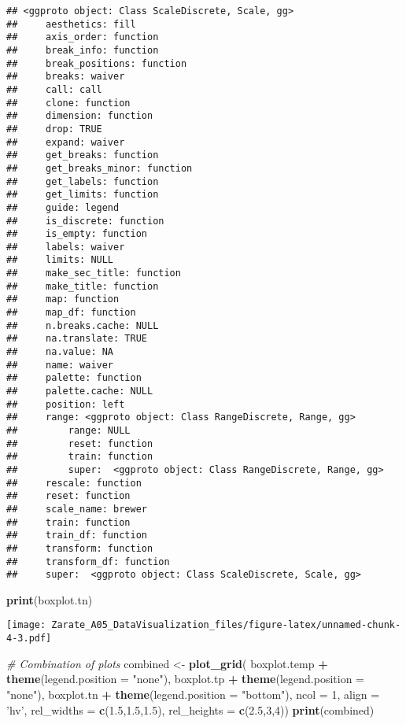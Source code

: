 \documentclass[
]{article}
\newenvironment{Shaded}{\begin{snugshade}}{\end{snugshade}}
\newcommand{\CommentTok}[1]{\textcolor[rgb]{0.56,0.35,0.01}{\textit{#1}}}
\newcommand{\DataTypeTok}[1]{\textcolor[rgb]{0.13,0.29,0.53}{#1}}
\newcommand{\DecValTok}[1]{\textcolor[rgb]{0.00,0.00,0.81}{#1}}
\newcommand{\FloatTok}[1]{\textcolor[rgb]{0.00,0.00,0.81}{#1}}
\newcommand{\KeywordTok}[1]{\textcolor[rgb]{0.13,0.29,0.53}{\textbf{#1}}}
\newcommand{\NormalTok}[1]{#1}
\newcommand{\OperatorTok}[1]{\textcolor[rgb]{0.81,0.36,0.00}{\textbf{#1}}}
\newcommand{\StringTok}[1]{\textcolor[rgb]{0.31,0.60,0.02}{#1}}
\begin{document}
\begin{verbatim}
## <ggproto object: Class ScaleDiscrete, Scale, gg>
##     aesthetics: fill
##     axis_order: function
##     break_info: function
##     break_positions: function
##     breaks: waiver
##     call: call
##     clone: function
##     dimension: function
##     drop: TRUE
##     expand: waiver
##     get_breaks: function
##     get_breaks_minor: function
##     get_labels: function
##     get_limits: function
##     guide: legend
##     is_discrete: function
##     is_empty: function
##     labels: waiver
##     limits: NULL
##     make_sec_title: function
##     make_title: function
##     map: function
##     map_df: function
##     n.breaks.cache: NULL
##     na.translate: TRUE
##     na.value: NA
##     name: waiver
##     palette: function
##     palette.cache: NULL
##     position: left
##     range: <ggproto object: Class RangeDiscrete, Range, gg>
##         range: NULL
##         reset: function
##         train: function
##         super:  <ggproto object: Class RangeDiscrete, Range, gg>
##     rescale: function
##     reset: function
##     scale_name: brewer
##     train: function
##     train_df: function
##     transform: function
##     transform_df: function
##     super:  <ggproto object: Class ScaleDiscrete, Scale, gg>
\end{verbatim}

\begin{Shaded}
\begin{Highlighting}[]
\KeywordTok{print}\NormalTok{(boxplot.tn)}
\end{Highlighting}
\end{Shaded}

\texttt{[image: Zarate\_A05\_DataVisualization\_files/figure-latex/unnamed-chunk-4-3.pdf]}

\begin{Shaded}
\begin{Highlighting}[]
\CommentTok{# Combination of plots}
\NormalTok{combined <-}\StringTok{ }\KeywordTok{plot_grid}\NormalTok{(}
\NormalTok{  boxplot.temp }\OperatorTok{+}\StringTok{ }\KeywordTok{theme}\NormalTok{(}\DataTypeTok{legend.position =} \StringTok{"none"}\NormalTok{),}
\NormalTok{  boxplot.tp }\OperatorTok{+}\StringTok{ }\KeywordTok{theme}\NormalTok{(}\DataTypeTok{legend.position =} \StringTok{"none"}\NormalTok{),}
\NormalTok{  boxplot.tn }\OperatorTok{+}\StringTok{ }\KeywordTok{theme}\NormalTok{(}\DataTypeTok{legend.position =} \StringTok{"bottom"}\NormalTok{),}
  \DataTypeTok{ncol =} \DecValTok{1}\NormalTok{, }\DataTypeTok{align =} \StringTok{'hv'}\NormalTok{, }\DataTypeTok{rel_widths =} \KeywordTok{c}\NormalTok{(}\FloatTok{1.5}\NormalTok{,}\FloatTok{1.5}\NormalTok{,}\FloatTok{1.5}\NormalTok{), }\DataTypeTok{rel_heights =} \KeywordTok{c}\NormalTok{(}\FloatTok{2.5}\NormalTok{,}\DecValTok{3}\NormalTok{,}\DecValTok{4}\NormalTok{))}
\KeywordTok{print}\NormalTok{(combined)}
\end{Highlighting}
\end{Shaded}
\end{document}
